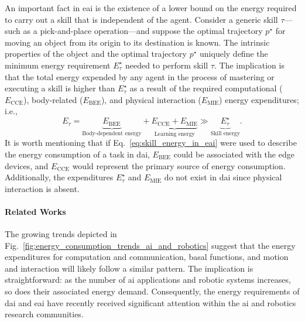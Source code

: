 \documentclass[12pt]{article}
\begin{document}
An important fact in \ac{eai} is the existence of a lower bound on the energy required to carry out a skill that is independent of the agent. Consider a generic skill $\tau$---such as a pick-and-place operation---and suppose the optimal trajectory $p^\star$ for moving an object from its origin to its destination is known. The intrinsic properties of the object and the optimal trajectory $p^\star$ uniquely define the minimum energy requirement $E^\star_{\tau}$ needed to perform skill $\tau$. The implication is that the total energy expended by any agent in the process of mastering or executing a skill is higher than $E^\star_{\tau}$ as a result of the required computational ($E_\text{CCE}$), body-related ($E_\text{BEE}$), and physical interaction ($E_\text{MIE}$) energy expenditures; i.e.,
\begin{equation}\label{eq:skill_energy_in_eai}
	E_{\tau} =  \underbrace{E_\text{BEE}}_{\text{Body-dependent energy}} + \underbrace{E_\text{CCE} + E_\text{MIE}}_{\text{Learning energy}} \gg \underbrace{E^\star_{\tau}}_{\text{Skill energy}} .
\end{equation}
It is worth mentioning that if Eq.~\eqref{eq:skill_energy_in_eai} were used to describe the energy consumption of a task in \ac{dai}, $E_\text{BEE}$ could be associated with the edge devices, and $E_\text{CCE}$ would represent the primary source of energy consumption. Additionally, the expenditures $E^\star_{\tau}$ and $E_\text{MIE}$ do not exist in \ac{dai} since physical interaction is absent.

\paragraph*{Related Works} The growing trends depicted in Fig.~\ref{fig:energy_consumption_trends_ai_and_robotics} suggest that the energy expenditures for computation and communication, basal functions, and motion and interaction will likely follow a similar pattern. The implication is straightforward: as the number of \ac{ai} applications and robotic systems increases, so does their associated energy demand. Consequently, the energy requirements of \ac{dai} and \ac{eai} have recently received significant attention within the \ac{ai} and robotics research communities.
\end{document}
